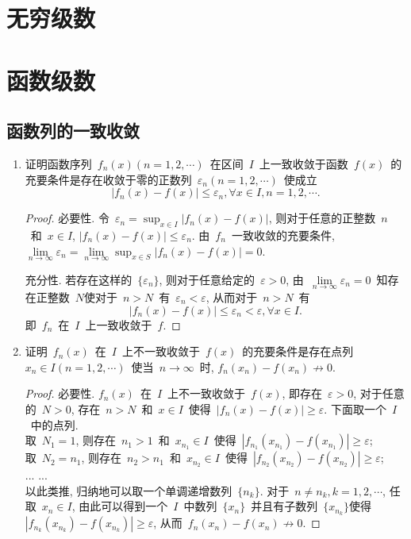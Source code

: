\documentclass[UTF8,a4paper,20pt]{article}
\begin{document}
\clearpage
\section{无穷级数}
\clearpage
\section{函数级数}
\subsection{函数列的一致收敛}
\begin{enumerate}[1.]
\item 证明函数序列~$f_n(x)(n=1,2,\cdots)$~在区间~$I$~上一致收敛于函数~$f(x)$~的充要条件是存在收敛于零的正数列~$\varepsilon_n(n=1,2,\cdots)$~使成立
\[|f_n(x)-f(x)|\leqslant\varepsilon_n, \forall x\in I, n=1,2,\cdots.\]
\begin{proof}
 	必要性. 令~$\varepsilon_n=\sup_{x\in I}|f_n(x)-f(x)|$, 则对于任意的正整数~$n$~和~$x\in I$, $|f_n(x)-f(x)|\leqslant\varepsilon_n$. 由~$f_n$~一致收敛的充要条件, $\lim\limits_{n\to\infty}\varepsilon_n=\lim\limits_{n\to\infty}\sup_{x\in S}|f_n(x)-f(x)|=0$.
	
	充分性. 若存在这样的~$\{\varepsilon_n\}$, 则对于任意给定的~$\varepsilon>0$, 由~$\lim\limits_{n\to\infty}\varepsilon_{n}=0$~知存在正整数~$N$使对于~$n>N$~有~$\varepsilon_n<\varepsilon$, 从而对于~$n>N$~有
\[|f_n(x)-f(x)|\leqslant\varepsilon_n<\varepsilon, \forall x\in I.\]
即~$f_n$~在~$I$~上一致收敛于~$f$.
\end{proof}
 
\item 证明~$f_n(x)$~在~$I$~上不一致收敛于~$f(x)$~的充要条件是存在点列~$x_n\in I(n=1,2,\cdots)$~使当~$n\to\infty$~时, $f_n(x_n)-f(x_n)\not\to 0$.
\begin{proof}
	必要性. $f_n(x)$~在~$I$~上不一致收敛于~$f(x)$, 即存在~$\varepsilon>0$, 对于任意的~$N>0$, 存在~$n>N$~和~$x\in I$~使得~$|f_n(x)-f(x)|\geqslant \varepsilon$. 下面取一个~$I$~中的点列. \\
	取~$N_1=1$, 则存在~$n_1>1$~和~$x_{n_1}\in I$~使得~$|f_{n_1}(x_{n_1})-f(x_{n_1})|\geqslant \varepsilon$;\\
	取~$N_2=n_1$, 则存在~$n_2>n_1$~和~$x_{n_2}\in I$~使得~$|f_{n_2}(x_{n_2})-f(x_{n_2})|\geqslant \varepsilon$;\\
	... ...\\
	以此类推, 归纳地可以取一个单调递增数列~$\{n_k\}$. 对于~$n\neq n_k, k=1,2,\cdots$, 任取~$x_n\in I$, 由此可以得到一个~$I$~中数列~$\{x_n\}$~并且有子数列~$\{x_{n_k}\}$使得~$|f_{n_k}(x_{n_k})-f(x_{n_k})|\geqslant \varepsilon$, 从而~$f_n(x_n)-f(x_n)\not\to 0$.


\end{proof}
\end{enumerate}
\end{document}
